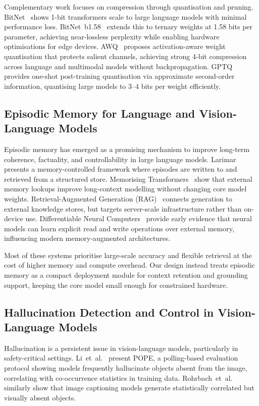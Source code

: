 \documentclass[runningheads]{llncs}
\begin{document}
Complementary work focuses on compression through quantisation and pruning.
BitNet~\cite{wang2023bitnet} shows 1-bit transformers scale to large
language models with minimal performance loss.
BitNet~b1.58~\cite{ma2024bitnet158} extends this to ternary weights at
1.58 bits per parameter, achieving near-lossless perplexity while
enabling hardware optimisations for edge devices.
AWQ~\cite{lin2023awq} proposes activation-aware weight quantisation that
protects salient channels, achieving strong 4-bit compression across
language and multimodal models without backpropagation.
GPTQ~\cite{frantar2022gptq} provides one-shot post-training quantisation
via approximate second-order information, quantising large models to
3--4 bits per weight efficiently.


\subsection{Episodic Memory for Language and Vision-Language Models}

Episodic memory has emerged as a promising mechanism to improve
long-term coherence, factuality, and controllability in large language
models.
Larimar~\cite{das2024larimar} presents a memory-controlled framework
where episodes are written to and retrieved from a structured store.
Memorising Transformers~\cite{wu2022memorising} show that external
memory lookups improve long-context modelling without changing core
model weights.
Retrieval-Augmented Generation (RAG)~\cite{lewis2020rag} connects
generation to external knowledge stores, but targets server-scale
infrastructure rather than on-device use.
Differentiable Neural Computers~\cite{graves2016dnc} provide early
evidence that neural models can learn explicit read and write operations
over external memory, influencing modern memory-augmented architectures.

Most of these systems prioritise large-scale accuracy and flexible
retrieval at the cost of higher memory and compute overhead. Our design
instead treats episodic memory as a compact deployment module for
context retention and grounding support, keeping the core model small
enough for constrained hardware.


\subsection{Hallucination Detection and Control in Vision-Language Models}

Hallucination is a persistent issue in vision-language models, particularly
in safety-critical settings.
Li~et~al.~\cite{li2023pope} present POPE, a polling-based evaluation protocol
showing models frequently hallucinate objects absent from the image, correlating
with co-occurrence statistics in training data.
Rohrbach~et~al.~\cite{rohrbach2018hallucination} similarly show that image
captioning models generate statistically correlated but visually absent objects.
\end{document}

